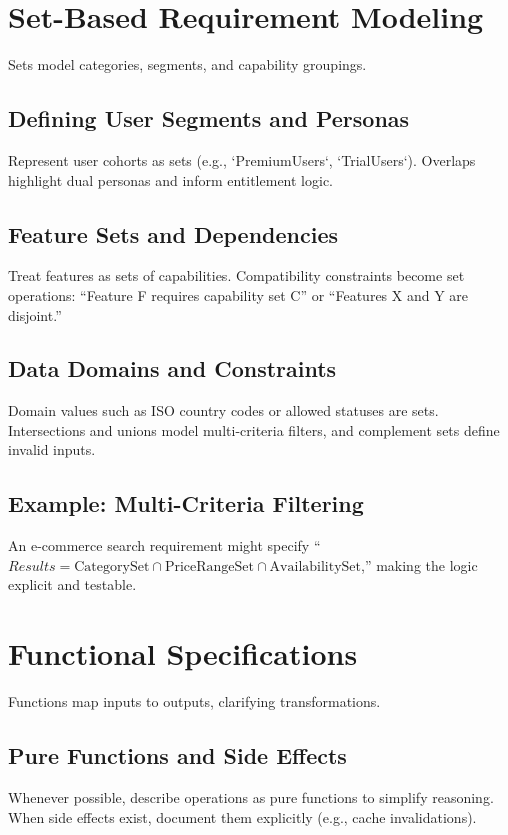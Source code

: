 \section{Set-Based Requirement Modeling}
\label{sec:set-based}

Sets model categories, segments, and capability groupings.

\subsection{Defining User Segments and Personas}
Represent user cohorts as sets (e.g., `PremiumUsers`, `TrialUsers`). Overlaps highlight dual personas and inform entitlement logic.

\subsection{Feature Sets and Dependencies}
Treat features as sets of capabilities. Compatibility constraints become set operations: ``Feature F requires capability set C'' or ``Features X and Y are disjoint.''

\subsection{Data Domains and Constraints}
Domain values such as ISO country codes or allowed statuses are sets. Intersections and unions model multi-criteria filters, and complement sets define invalid inputs.

\subsection{Example: Multi-Criteria Filtering}
An e-commerce search requirement might specify ``$Results = \text{CategorySet} \cap \text{PriceRangeSet} \cap \text{AvailabilitySet}$,'' making the logic explicit and testable.

\section{Functional Specifications}
\label{sec:functional-specs}

Functions map inputs to outputs, clarifying transformations.

\subsection{Pure Functions and Side Effects}
Whenever possible, describe operations as pure functions to simplify reasoning. When side effects exist, document them explicitly (e.g., cache invalidations).

